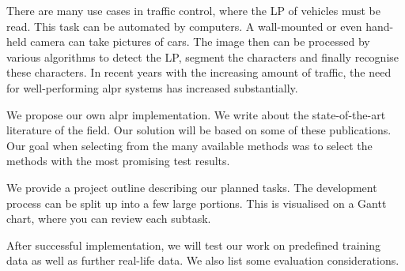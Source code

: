 
There are many use cases in traffic control, where the \ac{LP} of vehicles must
be read.  This task can be automated by computers. A wall-mounted or even
hand-held camera can take pictures of cars. The image then can be processed by
various algorithms to detect the \ac{LP}, segment the characters and finally
recognise these characters.  In recent years with the increasing amount of
traffic, the need for well-performing \ac{alpr} systems has increased
substantially.

We propose our own \ac{alpr} implementation.  We write about the
state-of-the-art literature of the field. Our solution will be based on some of
these publications. Our goal when selecting from the many available methods was
to select the methods with the most promising test results.

We provide a project outline describing our planned tasks. The development
process can be split up into a few large portions. This is visualised on a Gantt
chart, where you can review each subtask.

After successful implementation, we will test our work on predefined training
data as well as further real-life data. We also list some evaluation
considerations.

